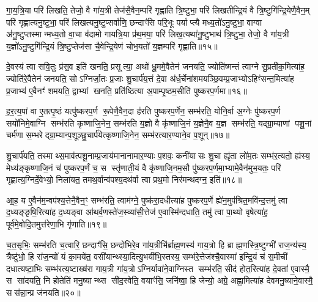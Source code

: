 गा॒य॒त्रि॒या परि॑ लिखति॒ तेजो॒ वै गा॑य॒त्री तेज॑सै॒वैन॒म्परि॑ गृह्णाति त्रि॒ष्टुभा॒ परि॑ लिखतीन्द्रि॒यं वै त्रि॒ष्टुगि॑न्द्रि॒येणै॒वैन॒म् परि॑ गृह्णात्यनु॒ष्टुभा॒ परि॑ लिखत्यनु॒ष्टुप्सर्वा॑णि॒ छन्दाꣳ॑सि परि॒भूः पर्याप्त्यै मध्य॒तो॑ऽनु॒ष्टुभा॒ वाग्वा अ॑नु॒ष्टुप्तस्मान्मध्य॒तो वा॒चा व॑दामो गायत्रि॒या प्र॑थ॒मया॒ परि॑ लिख॒त्यथा॑नु॒ष्टुभाथ॑ त्रि॒ष्टुभा॒ तेजो॒ वै गा॑य॒त्री य॒ज्ञो॑ऽनु॒ष्टुगि॑न्द्रि॒यं त्रि॒ष्टुप्तेज॑सा चै॒वेन्द्रि॒येण॑ चोभ॒यतो॑ य॒ज्ञम्परि॑ गृह्णाति॥१५॥

{\anuvakamend[{अ॒न्धोऽध्व॒र्युर्म॒हान्भ॑वति त्रि॒ष्टुभा॒ तेजो॒ वै गा॑य॒त्री त्रयो॑दश च॥३॥}]}

दे॒वस्य॑ त्वा सवि॒तुः प्र॑स॒व इति॑ खनति॒ प्रसूत्या॒ अथो॑ धू॒ममे॒वैतेन॑ जनयति॒ ज्योति॑ष्मन्तं त्वाग्ने सु॒प्रती॑क॒मित्या॑ह॒ ज्योति॑रे॒वैतेन॑ जनयति॒ सोऽग्निर्जा॒तः प्र॒जाः शु॒चार्प॑य॒त्तं दे॒वा अ॑र्ध॒र्चेना॑शमयञ्छि॒वम्प्र॒जाभ्योऽहिꣳ॑सन्त॒मित्या॑ह प्र॒जाभ्य॑ ए॒वैनꣳ॑ शमयति॒ द्वाभ्यां खनति॒ प्रति॑ष्ठित्या अ॒पाम्पृ॒ष्ठम॒सीति॑ पुष्करप॒र्णमा॥१६॥

ह॒र॒त्य॒पां वा ए॒तत्पृ॒ष्ठं यत्पु॑ष्करप॒र्ण रू॒पेणै॒वैन॒दा ह॑रति पुष्करप॒र्णेन॒ सम्भ॑रति॒ योनि॒र्वा अ॒ग्नेः पु॑ष्करप॒र्ण सयो॑निमे॒वाग्नि सम्भ॑रति कृष्णाजि॒नेन॒ सम्भ॑रति य॒ज्ञो वै कृ॑ष्णाजि॒नं य॒ज्ञेनै॒व य॒ज्ञ सम्भ॑रति॒ यद्ग्रा॒म्याणां पशू॒नां चर्म॑णा स॒म्भरेद्ग्रा॒म्यान्प॒शूञ्छु॒चार्प॑येत्कृष्णाजि॒नेन॒ सम्भ॑रत्यार॒ण्याने॒व प॒शून्॥१७॥

शु॒चार्प॑यति॒ तस्माथ्स॒माव॑त्पशू॒नाम्प्र॒जाय॑मानानामार॒ण्याः प॒शवः॒ कनी॑यासः शु॒चा ह्यृ॑ता लो॑म॒तः सम्भ॑र॒त्यतो॒ ह्य॑स्य॒ मेध्य॑ङ्कृष्णाजि॒नं च॑ पुष्करप॒र्णं च॒ स स्तृ॑णाती॒यं वै कृ॑ष्णाजि॒नम॒सौ पु॑ष्करप॒र्णमा॒भ्यामे॒वैन॑मुभ॒यतः॒ परि॑ गृह्णात्य॒ग्निर्दे॒वेभ्यो॒ निला॑यत॒ तमथ॒र्वान्व॑पश्य॒दथ॑र्वा त्वा प्रथ॒मो निर॑मन्थदग्न॒ इति॑॥१८॥

आ॒ह॒ य ए॒वैन॑म॒न्वप॑श्य॒त्तेनै॒वैन॒ꣳ॒ सम्भ॑रति॒ त्वाम॑ग्ने॒ पुष्क॑रा॒दधीत्या॑ह पुष्करप॒र्णे ह्ये॑न॒मुप॑श्रित॒मवि॑न्द॒त्तमु॑ त्वा द॒ध्यङ्ङृषि॒रित्या॑ह द॒ध्यङ्वा आ॑थर्व॒णस्ते॑ज॒स्व्या॑सी॒त्तेज॑ ए॒वास्मि॑न्दधाति॒ तमु॑ त्वा पा॒थ्यो वृषेत्या॑ह॒ पूर्व॑मे॒वोदि॒तमुत्त॑रेणा॒भि गृ॑णाति॥१९॥

च॒त॒सृभिः॒ सम्भ॑रति च॒त्वारि॒ छन्दाꣳ॑सि॒ छन्दो॑भिरे॒व गा॑य॒त्रीभि॑र्ब्राह्म॒णस्य॑ गाय॒त्रो हि ब्राह्म॒णस्त्रि॒॒ष्टुग्भी॑ राज॒न्य॑स्य॒ त्रैष्टु॑भो॒ हि रा॑ज॒न्यो॑ यं का॒मये॑त॒ वसी॑यान्थ्स्या॒दित्यु॒भयी॑भि॒स्तस्य॒ सम्भ॑रे॒त्तेज॑श्चै॒वास्मा॑ इन्द्रि॒यं च॑ स॒मीची॑ दधात्यष्टा॒भिः सम्भ॑रत्य॒ष्टाख्ष॑रा गाय॒त्री गा॑य॒त्रोऽग्निर्यावा॑ने॒वाग्निस्त सम्भ॑रति॒ सीद॑ होत॒रित्या॑ह दे॒वता॑ ए॒वास्मै॒ स सा॑दयति॒ नि होतेति॑ मनु॒ष्यान्थ्स सी॑द॒स्वेति॒ वयाꣳ॑सि॒ जनि॑ष्वा॒ हि जेन्यो॒ अग्रे॒ अह्ना॒मित्या॑ह देवमनु॒ष्याने॒वास्मै॒ सस॑न्ना॒न्प्र ज॑नयति॥२०॥

